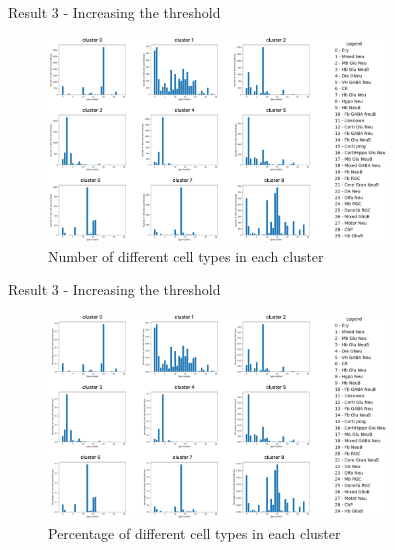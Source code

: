 \documentclass{beamer}
\begin{document}
\begin{frame}{Result 3 - Increasing the threshold}

\begin{figure}
    \centering
    \includegraphics[width=0.8\textwidth]{type_num_clusters6.png}
    \caption{Number of different cell types in each cluster}
\end{figure} 

\end{frame}
\begin{frame}{Result 3 - Increasing the threshold}

\begin{figure}
    \centering
    \includegraphics[width=0.8\textwidth]{type_p_clusters6.png}
    \caption{Percentage of different cell types in each cluster}
\end{figure} 

\end{frame}




\end{document}
